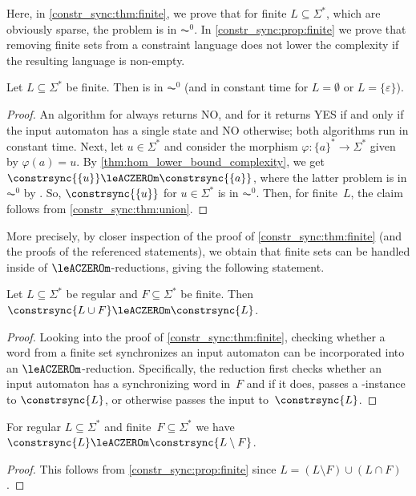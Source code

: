 
Here, in \cref{constr_sync:thm:finite}, 
we prove that for finite $L \subseteq \Sigma^*$, which are obviously sparse, the problem  is in $\AC^0$.
In \cref{constr_sync:prop:finite} we prove that removing finite sets
from a constraint language does not lower the complexity if the resulting language is non-empty.

\begin{theorem}
\label{constr_sync:thm:finite}
	Let $L \subseteq \Sigma^*$ be finite.
	Then  is in $\AC^0$
	(and in constant time for $L = \emptyset$ or $L = \{\varepsilon\}$). 
\end{theorem}
\begin{proof}
	An algorithm for \constrsync{\emptyset} always
	returns {\sc NO}, and for \constrsync{\{\varepsilon\}}
	it returns {\sc YES} if and only if the input
	automaton has a single state and {\sc NO} otherwise;
	both algorithms run in constant time.
	Next, let $u \in \Sigma^*$ and consider
	the morphism $\varphi \colon \{a\}^* \to \Sigma^*$ 
	given by $\varphi(a) = u$.
	By \cref{thm:hom_lower_bound_complexity},
	we get $\constrsync{\{u\}} \leACZEROm \constrsync{\{a\}}$,
	where the latter problem is in $\AC^0$ by .
	So, $\constrsync{\{u\}}$ for $u \in \Sigma^*$
	is in $\AC^0$.
	Then, for finite~$L$, the claim follows from 
	\cref{constr_sync:thm:union}.	
\end{proof} 

More precisely, by closer inspection of the proof of \cref{constr_sync:thm:finite}
(and the proofs of the referenced statements), we obtain that finite sets can be handled
inside of $\leACZEROm$-reductions, giving the following statement.

\begin{proposition} \label{constr_sync:prop:finite}
	Let $L \subseteq \Sigma^*$ be regular and $F \subseteq \Sigma^*$
	be finite. Then $\constrsync{L \cup F} \leACZEROm \constrsync{L}$.	
\end{proposition}
\begin{proof}
	Looking into the proof of \cref{constr_sync:thm:finite},
	checking whether a word from a finite set
	synchronizes an input automaton can be incorporated into
	an $\leACZEROm$-reduction.
	Specifically, the reduction first checks whether
	an input automaton has a synchronizing word in~$F$
	and if it does, passes a \rYES-instance to $\constrsync{L}$,
	or otherwise passes the input to~$\constrsync{L}$.	
\end{proof}

\begin{corollary}
	For regular $L \subseteq \Sigma^*$
	and finite~$F \subseteq \Sigma^*$
	we have $\constrsync{L} \leACZEROm \constrsync{L \setminus F}$.
\end{corollary}
\begin{proof}
	This follows from \cref{constr_sync:prop:finite} since $L = ( L \setminus F ) \cup (L \cap F)$.	
\end{proof}